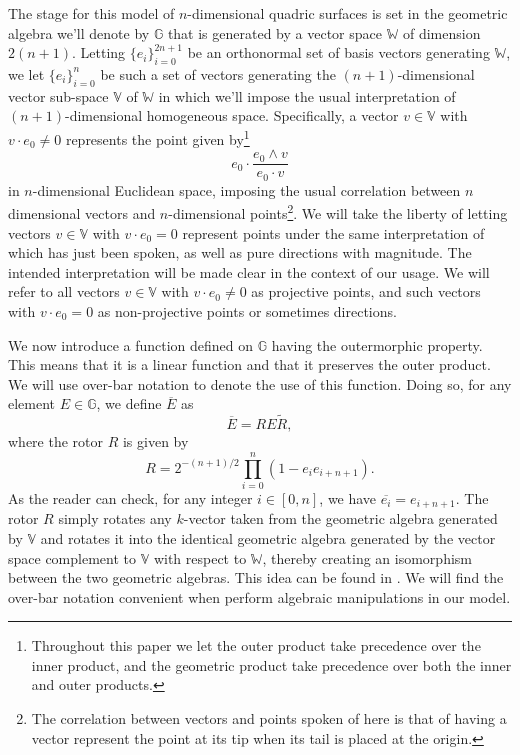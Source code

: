 \documentclass{ecgd-l}
\newcommand{\G}{\mathbb{G}}
\newcommand{\V}{\mathbb{V}}
\newcommand{\W}{\mathbb{W}}
\theoremstyle{definition}
\theoremstyle{remark}
\numberwithin{equation}{section}
\begin{document}
The stage for this model of $n$-dimensional quadric surfaces is set in the geometric
algebra we'll denote by $\G$ that is generated by a vector space $\W$ of dimension
$2(n+1)$.  Letting $\{e_i\}_{i=0}^{2n+1}$ be an orthonormal set of basis vectors
generating $\W$, we let $\{e_i\}_{i=0}^n$ be such a set of vectors generating
the $(n+1)$-dimensional vector sub-space $\V$ of $\W$ in which we'll impose the
usual interpretation of $(n+1)$-dimensional homogeneous space.  Specifically,
a vector $v\in\V$ with $v\cdot e_0\neq 0$ represents the point given by\footnote{Throughout this
paper we let the outer product take precedence over the inner product, and the geometric product
take precedence over both the inner and outer products.}
\begin{equation}
e_0\cdot\frac{e_0\wedge v}{e_0\cdot v}
\end{equation}
in $n$-dimensional Euclidean space, imposing the usual correlation between $n$ dimensional
vectors and $n$-dimensional points\footnote{The correlation between
vectors and points spoken of here is that of having a vector represent the point
at its tip when its tail is placed at the origin.}.  We will take the liberty of letting vectors $v\in\V$ with $v\cdot e_0=0$
represent points under the same interpretation of which has just been spoken, as
well as pure directions with magnitude.  The intended interpretation will be made clear
in the context of our usage.  We will refer to all vectors $v\in\V$ with $v\cdot e_0\neq 0$
as projective points, and such vectors with $v\cdot e_0=0$ as non-projective points
or sometimes directions.

We now introduce a function defined on $\G$ having the outermorphic property.
This means that it is a linear function and that it preserves the outer product.  We will
use over-bar notation to denote the use of this function.  Doing so, for any
element $E\in\G$, we define $\overline{E}$ as
\begin{equation}
\overline{E} = RE\tilde{R},
\end{equation}
where the rotor $R$ is given by
\begin{equation}
R = 2^{-(n+1)/2}\prod_{i=0}^n\left(1-e_ie_{i+n+1}\right).
\end{equation}
As the reader can check, for any integer $i\in[0,n]$, we have $\overline{e_i}=e_{i+n+1}$.
The rotor $R$ simply rotates any $k$-vector taken from the geometric algebra generated
by $\V$ and rotates it into the identical geometric algebra generated by the vector
space complement to $\V$ with respect to $\W$, thereby creating an isomorphism
between the two geometric algebras.  This idea can be found in \cite{DoranHestenes93}.
We will find the over-bar notation convenient when perform algebraic manipulations in our model.
\end{document}
